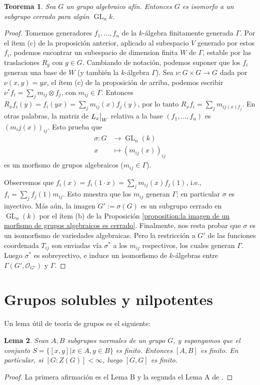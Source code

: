 \documentclass[spanish,10pt]{amsart}
\newtheorem{theorem}{Teorema}[section]
\newtheorem{lemma}[theorem]{Lema}
\theoremstyle{definition}
\theoremstyle{remark}
\numberwithin{equation}{section}
\newcommand\rest[2]{{%
  \left.\kern-\nulldelimiterspace %
  #1 %
  \vphantom{\big|} %
  \right|_{#2} %
  }}
\renewcommand{\O}{\mathcal{O}}
\begin{document}
\begin{theorem}
Sea $G$ un grupo algebraico afín. Entonces $G$ es isomorfo a un subgrupo cerrado para algún $\operatorname{GL}_n k$.
\end{theorem}
\begin{proof}
Tomemos generadores $f_1, \ldots, f_n$ de la $k$-álgebra finitamente generada $\Gamma$. Por el ítem (c) de la proposición anterior, aplicado al subespacio $V$ generado por estos $f_i$, podemos encontrar un subespacio de dimension finita $W$ de $\Gamma$, estable por las traslaciones $R_g$ con $g \in G$. Cambiando de notación, podemos suponer que los $f_i$ generan una base de $W$ (y también la $k$-álgebra $\Gamma$). Sea $\nu : G \times G \to G$ dada por $\nu (x,y) = yx$, el ítem (c) de la proposición de arriba, podemos escribir $\nu^* f_i = \sum_{j} m_{ij} \otimes f_j$, con $m_{ij} \in \Gamma$. Entonces $R_x f_i (y) = f_i (y x) = \sum_j m_{ij} (x) f_j (y)$, por lo tanto $R_x f_i = \sum_j m_{ij (x) f_j}$. En otras palabras, la matriz de $\rest{L_x} W$ relativa a la base $(f_1, \ldots,f_n)$ es $(m_ij (x))_{ij}$. Esto prueba que
\begin{align*}
    \sigma : G &\longrightarrow \operatorname{GL}_n (k) \\
    x &\longmapsto (m_{ij} (x))_{ij}
\end{align*}
es un morfismo de grupos algebraicos ($m_{ij} \in \Gamma$).

Observemos que $f_i (x) = f_i (1 \cdot x) = \sum_{j} m_{ij} (x) f_j (1)$, i.e., $f_i = \sum_j f_j (1) m_{ij}$. Esto muestra que los $m_{ij}$ generan $\Gamma$; en particular $\sigma$ es inyectivo. Más aún, la imagen $G' := \sigma (G)$ es un subgrupo cerrado en $\operatorname{GL}_n (k)$ por el ítem (b) de la Proposición \ref{proposition:la imagen de un morfismo de grupos algebraicos es cerrado}. Finalmente, nos resta probar que $\sigma$ es un isomorfismo de variedades algebraicas. Pero la restricción a $G'$ de las funciones coordenada $T_{ij}$ son enviadas vía $\sigma^*$ a los $m_{ij}$ respectivos, los cuales generan $\Gamma$. Luego $\sigma^*$ es sobreyectivo, e induce un isomorfismo de $k$-álgebras entre $\Gamma (G', \O_{G'})$ y $\Gamma$.
\end{proof}




\section{Grupos solubles y nilpotentes}

Un lema útil de teoría de grupos es el siguiente:
\begin{lemma}\label{lemma:lema util de teoria de grupos}
Sean $A,B$ subgrupos normales de un grupo $G$, y supongamos que el conjunto $S = \{[x,y] | x \in A, y \in B\}$ es finito. Entonces $[A,B]$ es finito. En particular, si $[G : Z(G)] < \infty$, luego $[G,G]$ es finito.
\end{lemma}
\begin{proof}
La primera afirmación es el Lema B y la segunda el Lema A de \cite{humphreys2012linearAlgebraicGroups}.
\end{proof}
\end{document}

